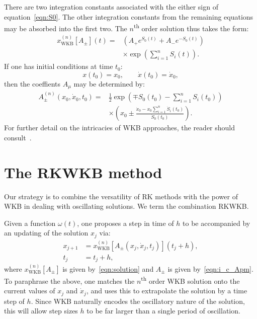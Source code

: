 There are two integration constants associated with the either sign of equation~\eqref{eqn:S0}. The other integration constants from the remaining equations may be absorbed into the first two. The \(n\)\textsuperscript{th} order solution thus takes the form:
\begin{align}
  x_\mathrm{WKB}^{(n)}[A_{\pm}](t) =&
  \left( A_{+} e^{S_0(t)} + A_{-} e^{-S_0(t)} \right)
  \nonumber\\
  &\times \exp\left( \sum_{i=1}^n S_i(t) \right).
  \label{eqn:solution}
\end{align}
If one has initial conditions at time \(t_0\):
\begin{equation}
  x(t_0) = x_0, \qquad \dot{x}(t_0)=\dot{x}_0,
  \label{eqn:i_c}
\end{equation}
then the coeffients \(A_\mu\) may be determined by:
\begin{align}
  A_\pm^{(n)}(x_0,\dot{x}_0,t_0) =& \frac{1}{2}\exp{\left( \mp S_0(t_0) - \sum_{i=1}^n S_i(t_0) \right)}
  \nonumber\\
  &\times\left( x_0 \pm  \frac{\dot{x}_0-x_0\sum_{i=1}^n \dot{S}_i(t_0)}{\dot{S}_0(t_0)}\right).
  \label{eqn:i_c_Apm}
\end{align}
For further detail on the intricacies of WKB approaches, the reader should consult~\cite{RHB,Bender+2010}.

\section{The RKWKB method}
Our strategy is to combine the versatility of RK methods with the power of WKB in dealing with oscillating solutions. We term the combination RKWKB\@.

Given a function \(\omega(t)\), one proposes a step in time of \(h\) to be accompanied by an updating of the solution \(x_j\) via:
\begin{align}
  x_{j+1} &= x_\mathrm{WKB}^{(n)}[A_\pm(x_j,\dot{x}_j,t_j)](t_j+h),
  \label{eqn:WKB_x_step} \\
  t_j &= t_j+h,
  \label{eqn:WKB_t_step}
\end{align}
where \(x_\mathrm{WKB}^{(n)}[A_{\pm}]\) is given by~\eqref{eqn:solution} and \(A_{\pm}\) is given by~\eqref{eqn:i_c_Apm}.
To paraphrase the above, one matches the \(n\)\textsuperscript{th} order WKB solution onto the current values of \(x_j\) and \(\dot{x}_j\), and uses this to extrapolate the solution by a time step of \(h\). Since WKB naturally encodes the oscillatory nature of the solution, this will allow step sizes \(h\) to be far larger than a single period of oscillation. 

